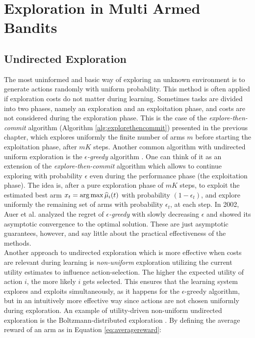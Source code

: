 \section{Exploration in Multi Armed Bandits} \label{sec:expinmab}

\subsection{Undirected Exploration}
The most uninformed and basic way of exploring an unknown environment is to generate actions randomly with uniform probability. This method is often applied if exploration costs do not matter during learning. Sometimes tasks are divided into two phases, namely an exploration and an exploitation phase, and costs are not considered during the exploration phase. This is the case of the \emph{explore-then-commit} algorithm (Algorithm \ref{alg:explorethencommit}) presented in the previous chapter, which explores uniformly the finite number of arms $m$ before starting the exploitation phase, after $mK$ steps. Another common algorithm with undirected uniform exploration is the $\epsilon$\emph{-greedy} algorithm \cite{lattimore2019bandit}. One can think of it as an extension of the \emph{explore-then-commit} algorithm which allows to continue exploring with probability $\epsilon$ even during the performance phase (\ie the exploitation phase). The idea is, after a pure exploration phase of $mK$ steps, to exploit the estimated best arm $x_t = \arg \max \widehat{\mu}_i(t)$ with probability $(1-\epsilon_t)$, and explore uniformly the remaining set of arms with probability $\epsilon_t$, at each step. In 2002, Auer et al. \cite{auer2002finite} analyzed the regret of $\epsilon$\emph{-greedy} with slowly decreasing $\epsilon$ and showed its asymptotic convergence to the optimal solution. These are just asymptotic guarantees, however, and say little about the practical effectiveness of the methods.\\
Another approach to undirected exploration which is more effective when costs are relevant during learning is \emph{non-uniform} exploration utilizing the current utility estimates to influence action-selection. The higher the expected utility of action $i$, the more likely $i$ gets selected. This ensures that the learning system explores and exploits simultaneously, as it happens for the $\epsilon$-greedy algorithm, but in an intuitively more effective way since actions are not chosen uniformly during exploration. An example of utility-driven non-uniform undirected exploration is the  Boltzmann-distributed exploration \cite{cesa2017boltzmann}. By defining the average reward of an arm as in Equation \ref{eq:averagereward}:

